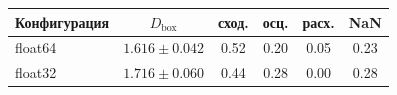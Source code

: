 \begin{tabular}{lccccc}
\toprule
Конфигурация & $D_{\mathrm{box}}$ & сход. & осц. & расх. & NaN\\
\midrule
float64 & $1.616 \pm 0.042$ & 0.52 & 0.20 & 0.05 & 0.23\\
float32 & $1.716 \pm 0.060$ & 0.44 & 0.28 & 0.00 & 0.28\\
\bottomrule
\end{tabular}
